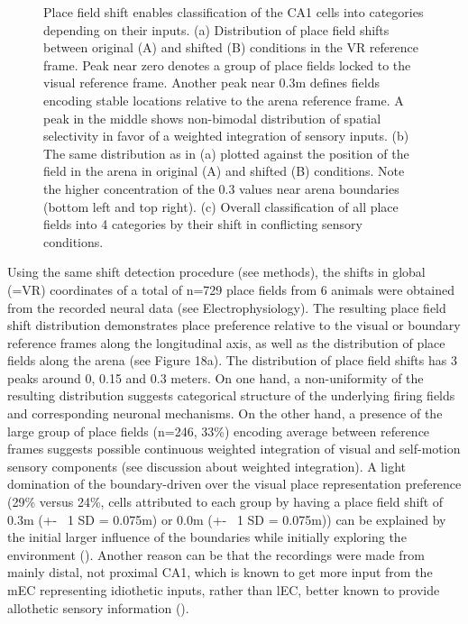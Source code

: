 \begin{figure}
\captionsetup{format=plain}
\caption[Place field shift distribution in conflict]{
Place field shift enables classification of the CA1 cells into categories depending on their inputs. (a) Distribution of place field shifts between original (A) and shifted (B) conditions in the VR reference frame. Peak near zero denotes a group of place fields locked to the visual reference frame. Another peak near 0.3m defines fields encoding stable locations relative to the arena reference frame. A peak in the middle shows non-bimodal distribution of spatial selectivity in favor of a weighted integration of sensory inputs. (b) The same distribution as in (a) plotted against the position of the field in the arena in original (A) and shifted (B) conditions. Note the higher concentration of the 0.3 values near arena boundaries (bottom left and top right). (c) Overall classification of all place fields into 4 categories by their shift in conflicting sensory conditions.
}
\label{fig:F18_shift_distribution}
\end{figure}

Using the same shift detection procedure (see methods), the shifts in global (=VR) coordinates of a total of n=729 place fields from 6 animals were obtained from the recorded neural data (see Electrophysiology). The resulting place field shift distribution demonstrates place preference relative to the visual or boundary reference frames along the longitudinal axis, as well as the distribution of place fields along the arena (see Figure 18a). The distribution of place field shifts has 3 peaks around 0, 0.15 and 0.3 meters. On one hand, a non-uniformity of the resulting distribution suggests categorical structure of the underlying firing fields and corresponding neuronal mechanisms. On the other hand, a presence of the large group of place fields (n=246, 33\%) encoding average between reference frames suggests possible continuous weighted integration of visual and self-motion sensory components (see discussion about weighted integration).
A light domination of the boundary-driven over the visual place representation preference (29\% versus 24\%, cells attributed to each group by having a place field shift of 0.3m (+- ~1 SD = 0.075m) or 0.0m (+- ~1 SD = 0.075m)) can be explained by the initial larger influence of the boundaries while initially exploring the environment (\cite{Keinath2018}). Another reason can be that the recordings were made from mainly distal, not proximal CA1, which is known to get more input from the mEC representing idiothetic inputs, rather than lEC, better known to provide allothetic sensory information (\cite{Knierim2014}).

